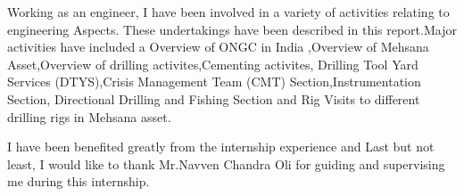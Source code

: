 \documentclass[11pt,a4paper]{report}
\makeatletter
\newcommand\mainmatter{%
    \cleardoublepage
  \pagenumbering{arabic}}
\makeatother
\begin{document}
\vspace{1em}

Working as  an engineer, I  have been  involved  in  a variety of activities  relating to engineering Aspects.
These  undertakings have been  described  in this  report.Major activities  have  included a Overview of ONGC 
in India ,Overview of Mehsana Asset,Overview of drilling activites,Cementing activites,
Drilling Tool Yard Services (DTYS),Crisis Management Team (CMT) Section,Instrumentation Section, 
Directional Drilling and Fishing Section and Rig Visits to different drilling rigs in Mehsana asset.

\vspace{1em}

I have been benefited greatly  from the internship experience and Last but not least,
I would like to thank Mr.Navven Chandra Oli for guiding  and supervising me during this internship. 

\newpage


\listoftables



\listoffigures



\mainmatter

\singlespacing






















\end{document}
